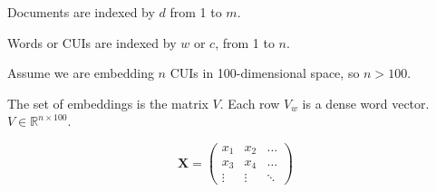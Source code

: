 \documentclass{article}
\begin{document}
Documents are indexed by $d$ from 1 to $m$.

Words or CUIs are indexed by $w$ or $c$, from 1 to $n$.

Assume we are embedding $n$ CUIs in 100-dimensional space, so $n > 100$.

The set of embeddings is the matrix $V$. Each row $V_w$ is a dense
word vector. $V \in \mathbb{R}^{n \times 100}$.

\begin{equation}
  \mathbf{X} = \left(
      \begin{array}{ccc}
        x_1 & x_2 & \ldots \\
        x_3 & x_4 & \ldots \\
        \vdots & \vdots & \ddots
      \end{array} \right)
\end{equation}
\end{document}
